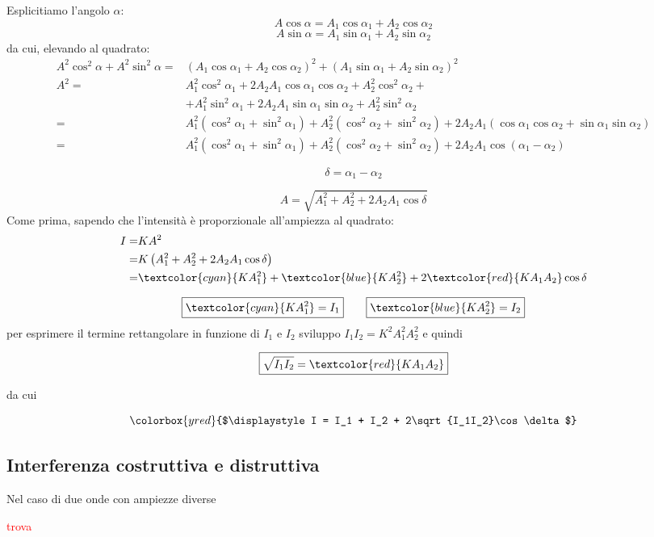 \documentclass[x11names]{report}
\newcommand{\viola}[1]{\colorbox{yred}{$\displaystyle #1$}}
\begin{document}
	Esplicitiamo l'angolo \(\alpha\):
	\[ 
	A\cos\alpha = A_1\cos\alpha_1 + A_2\cos\alpha_2		
	\]
	\[ 
	A\sin\alpha = A_1\sin\alpha_1 + A_2\sin\alpha_2		
	\]
	da cui, elevando al quadrato:
	\begin{align*} 
		A^2\cos^2\alpha + A^2\sin^2\alpha =& (A_1\cos\alpha_1 + A_2\cos\alpha_2)^2 + (A_1\sin\alpha_1 + A_2\sin\alpha_2)^2\\
		A^2 =& A_1^2\cos^2\alpha_1 + 2A_2A_1\cos\alpha_1\cos\alpha_2 + A_2^2\cos^2\alpha_2 + \\ &+ A_1^2\sin^2\alpha_1 + 2A_2A_1\sin\alpha_1\sin\alpha_2 + A_2^2\sin^2\alpha_2\\
		=& A_1^2(\cos^2\alpha_1 + \sin^2\alpha_1) + A_2^2(\cos^2\alpha_2 + \sin^2\alpha_2) + 2A_2A_1(\cos\alpha_1\cos\alpha_2 + \sin\alpha_1\sin\alpha_2)\\
		=&  A_1^2(\cos^2\alpha_1 + \sin^2\alpha_1) + A_2^2(\cos^2\alpha_2 + \sin^2\alpha_2) +  2A_2A_1\cos\left(\alpha_1 - \alpha_2\right)
	\end{align*} 
	
	\[ 
	\boxed{\delta = \alpha_1 - \alpha_2}
	\]
	
	\begin{equation}
		A = \sqrt{A_1^2 + A_2^2 + 2A_2A_1\cos\delta}
	\end{equation}
	Come prima, sapendo che l'intensità è proporzionale all'ampiezza al quadrato:
	\begin{align*}
		I =& KA^2 \\ 
		=& K\left(A_1^2 + A_2^2 + 2A_2A_1\cos\delta\right)\\
		=& \textcolor{cyan}{KA_1^2} + \textcolor{blue}{KA_2^2} + 2\textcolor{red}{KA_1A_2}\cos\delta
	\end{align*}
	
	\[ 
	\boxed{\textcolor{cyan}{KA_1^2}= I_1} \qquad \boxed{\textcolor{blue}{KA_2^2} = I_2 } 
	\]
	per esprimere il termine rettangolare in funzione di \(I_1\) e \(I_2\) sviluppo \(I_1I_2 = K^2A_1^2A_2^2\) e quindi
	
	\[ 
	\boxed{\sqrt{I_1I_2} = \textcolor{red}{KA_1A_2}}
	\]
	
	da cui
	
	\begin{equation}
		\viola{I = I_1 + I_2 + 2\sqrt{I_1I_2}\cos\delta}
	\end{equation}
	
	
	\begin{es}{}
		\subsection{Interferenza costruttiva e distruttiva}
		Nel caso di due onde con ampiezze diverse 
		\begin{center}
			\textcolor{red}{trova}
		\end{center}
		
	\end{es}
	
\end{document}
